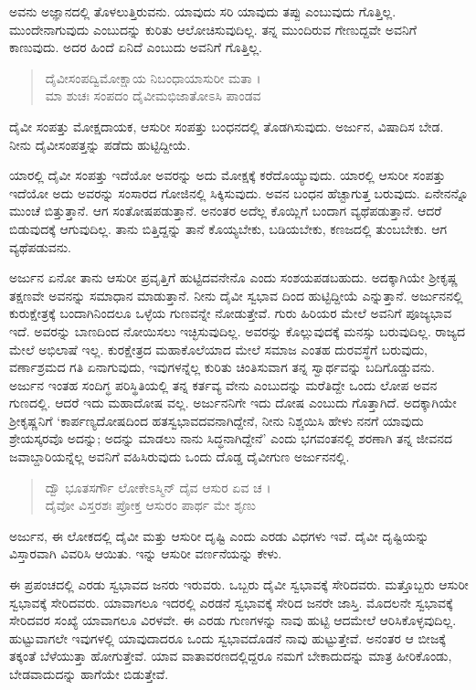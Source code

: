 ಅವನು ಅಜ್ಞಾನದಲ್ಲಿ ತೊಳಲುತ್ತಿರುವನು. ಯಾವುದು ಸರಿ ಯಾವುದು ತಪ್ಪು ಎಂಬುವುದು ಗೊತ್ತಿಲ್ಲ. ಮುಂದೇನಾಗುವುದು ಎಂಬುದನ್ನು ಕುರಿತು ಆಲೋಚಿಸುವುದಿಲ್ಲ. ತನ್ನ ಮುಂದಿರುವ ಗೇಣುದ್ದವೇ ಅವನಿಗೆ ಕಾಣುವುದು. ಅದರ ಹಿಂದೆ ಏನಿದೆ ಎಂಬುದು ಅವನಿಗೆ ಗೊತ್ತಿಲ್ಲ.

\begin{verse}
ದೈವೀಸಂಪದ್ವಿಮೋಕ್ಷಾಯ ನಿಬಂಧಾಯಾಸುರೀ ಮತಾ ।\\ಮಾ ಶುಚಃ ಸಂಪದಂ ದೈವೀಮಭಿಜಾತೋಽಸಿ ಪಾಂಡವ 
\end{verse}

{\small ದೈವೀ ಸಂಪತ್ತು ಮೋಕ್ಷದಾಯಕ, ಆಸುರೀ ಸಂಪತ್ತು ಬಂಧನದಲ್ಲಿ ತೊಡಗಿಸುವುದು. ಅರ್ಜುನ, ವಿಷಾದಿಸ ಬೇಡ. ನೀನು ದೈವೀಸಂಪತ್ತನ್ನು ಪಡೆದು ಹುಟ್ಟಿದ್ದೀಯೆ.}

ಯಾರಲ್ಲಿ ದೈವೀ ಸಂಪತ್ತು ಇದೆಯೋ ಅವರನ್ನು ಅದು ಮೋಕ್ಷಕ್ಕೆ ಕರೆದೊಯ್ಯುವುದು. ಯಾರಲ್ಲಿ ಆಸುರೀ ಸಂಪತ್ತು ಇದೆಯೋ ಅದು ಅವರನ್ನು ಸಂಸಾರದ ಗೋಜಿನಲ್ಲಿ ಸಿಕ್ಕಿಸುವುದು. ಅವನ ಬಂಧನ ಹೆಚ್ಟಾಗುತ್ತ ಬರುವುದು. ಏನೇನನ್ನೊ ಮುಂಚೆ ಬಿತ್ತುತ್ತಾನೆ. ಆಗ ಸಂತೋಷಪಡುತ್ತಾನೆ. ಅನಂತರ ಅದೆಲ್ಲ ಕೊಯ್ಲಿಗೆ ಬಂದಾಗ ವ್ಯಥೆಪಡುತ್ತಾನೆ. ಆದರೆ ಬಿಡುವುದಕ್ಕೆ ಆಗುವುದಿಲ್ಲ. ತಾನು ಬಿತ್ತಿದ್ದನ್ನು ತಾನೆ ಕೊಯ್ಯಬೇಕು, ಬಡಿಯಬೇಕು, ಕಣಜದಲ್ಲಿ ತುಂಬಬೇಕು. ಆಗ ವ್ಯಥೆಪಡುವನು.

ಅರ್ಜುನ ಏನೋ ತಾನು ಆಸುರೀ ಪ್ರವೃತ್ತಿಗೆ ಹುಟ್ಟಿದವನೇನೊ ಎಂದು ಸಂಶಯಪಡಬಹುದು. ಅದಕ್ಕಾಗಿಯೇ ಶ್ರೀಕೃಷ್ಣ ತಕ್ಷಣವೇ ಅವನನ್ನು ಸಮಾಧಾನ ಮಾಡುತ್ತಾನೆ. ನೀನು ದೈವೀ ಸ್ವಭಾವ ದಿಂದ ಹುಟ್ಟಿದ್ದೀಯೆ ಎನ್ನುತ್ತಾನೆ. ಅರ್ಜುನನಲ್ಲಿ ಕುರುಕ್ಷೇತ್ರಕ್ಕೆ ಬಂದಾಗಿನಿಂದಲೂ ಒಳ್ಳೆಯ ಗುಣವನ್ನೇ ನೋಡುತ್ತೇವೆ. ಗುರು ಹಿರಿಯರ ಮೇಲೆ ಅವನಿಗೆ ಪೂಜ್ಯಭಾವ ಇದೆ. ಅವರನ್ನು ಬಾಣದಿಂದ ನೋಯಿಸಲು ಇಚ್ಛಿಸುವುದಿಲ್ಲ. ಅವರನ್ನು ಕೊಲ್ಲುವುದಕ್ಕೆ ಮನಸ್ಸು ಬರುವುದಿಲ್ಲ. ರಾಜ್ಯದ ಮೇಲೆ ಅಭಿಲಾಷೆ ಇಲ್ಲ. ಕುರಕ್ಷೇತ್ರದ ಮಹಾಕೊಲೆಯಾದ ಮೇಲೆ ಸಮಾಜ ಎಂತಹ ದುರವಸ್ಥೆಗೆ ಬರುವುದು, ವರ್ಣಾಶ್ರಮದ ಗತಿ ಏನಾಗುವುದು, ಇವುಗಳನ್ನೆಲ್ಲ ಕುರಿತು ಚಿಂತಿಸುವಾಗ ತನ್ನ ಸ್ವಾರ್ಥವನ್ನು ಬದಿಗೊಡ್ಡುವನು. ಅರ್ಜುನ ಇಂತಹ ಸಂದಿಗ್ಧ ಪರಿಸ್ಥಿತಿಯಲ್ಲಿ ತನ್ನ ಕರ್ತವ್ಯ ವೇನು ಎಂಬುದನ್ನು ಮರೆತಿದ್ದೇ ಒಂದು ಲೋಪ ಅವನ ಗುಣದಲ್ಲಿ. ಆದರೆ ಇದು ಮಹಾದೋಷ ವಲ್ಲ. ಅರ್ಜುನನಿಗೇ ಇದು ದೋಷ ಎಂಬುದು ಗೊತ್ತಾಗಿದೆ. ಅದಕ್ಕಾಗಿಯೇ ಶ್ರೀಕೃಷ್ಣನಿಗೆ ‘ಕಾರ್ಪಣ್ಯದೋಷದಿಂದ ಹತಸ್ವಭಾವದವನಾಗಿದ್ದೇನೆ, ನೀನು ನಿಶ್ಚಯಿಸಿ ಹೇಳು ನನಗೆ ಯಾವುದು ಶ್ರೇಯಸ್ಕರವೊ ಅದನ್ನು; ಅದನ್ನು ಮಾಡಲು ನಾನು ಸಿದ್ಧನಾಗಿದ್ದೇನೆ’ ಎಂದು ಭಗವಂತನಲ್ಲಿ ಶರಣಾಗಿ ತನ್ನ ಜೀವನದ ಜವಾಬ್ದಾರಿಯನ್ನೆಲ್ಲ ಅವನಿಗೆ ವಹಿಸಿರುವುದು ಒಂದು ದೊಡ್ಡ ದೈವೀಗುಣ ಅರ್ಜುನನಲ್ಲಿ.

\begin{verse}
ದ್ವೌ ಭೂತಸರ್ಗೌ ಲೋಕೇಽಸ್ಮಿನ್ ದೈವ ಆಸುರ ಏವ ಚ ।\\ದೈವೋ ವಿಸ್ತರಶಃ ಪ್ರೋಕ್ತ ಆಸುರಂ ಪಾರ್ಥ ಮೇ ಶೃಣು 
\end{verse}

{\small ಅರ್ಜುನ, ಈ ಲೋಕದಲ್ಲಿ ದೈವೀ ಮತ್ತು ಆಸುರೀ ದೃಷ್ಟಿ ಎಂದು ಎರಡು ವಿಧಗಳು ಇವೆ. ದೈವೀ ದೃಷ್ಟಿಯನ್ನು ವಿಸ್ತಾರವಾಗಿ ವಿವರಿಸಿ ಆಯಿತು. ಇನ್ನು ಆಸುರೀ ವರ್ಣನೆಯನ್ನು ಕೇಳು.}

ಈ ಪ್ರಪಂಚದಲ್ಲಿ ಎರಡು ಸ್ವಭಾವದ ಜನರು ಇರುವರು. ಒಬ್ಬರು ದೈವೀ ಸ್ವಭಾವಕ್ಕೆ ಸೇರಿದವರು. ಮತ್ತೊಬ್ಬರು ಆಸುರೀ ಸ್ವಭಾವಕ್ಕೆ ಸೇರಿದವರು. ಯಾವಾಗಲೂ ಇದರಲ್ಲಿ ಎರಡನೆ ಸ್ವಭಾವಕ್ಕೆ ಸೇರಿದ ಜನರೇ ಜಾಸ್ತಿ. ಮೊದಲನೇ ಸ್ವಭಾವಕ್ಕೆ ಸೇರಿದವರ ಸಂಖ್ಯೆ ಯಾವಾಗಲೂ ವಿರಳವೇ. ಈ ಎರಡು ಗುಣಗಳನ್ನು ನಾವು ಹುಟ್ಟಿ ಆದಮೇಲೆ ಆರಿಸಿಕೊಳ್ಳವುದಿಲ್ಲ. ಹುಟ್ಟುವಾಗಲೇ ಇವುಗಳಲ್ಲಿ ಯಾವುದಾದರೂ ಒಂದು ಸ್ವಭಾವದೊಡನೆ ನಾವು ಹುಟ್ಟುತ್ತೇವೆ. ಅನಂತರ ಆ ಬೀಜಕ್ಕೆ ತಕ್ಕಂತೆ ಬೆಳೆಯುತ್ತಾ ಹೋಗುತ್ತೇವೆ. ಯಾವ ವಾತಾವರಣದಲ್ಲಿದ್ದರೂ ನಮಗೆ ಬೇಕಾದುದನ್ನು ಮಾತ್ರ ಹೀರಿಕೊಂಡು, ಬೇಡವಾದುದನ್ನು ಹಾಗೆಯೇ ಬಿಡುತ್ತೇವೆ.


